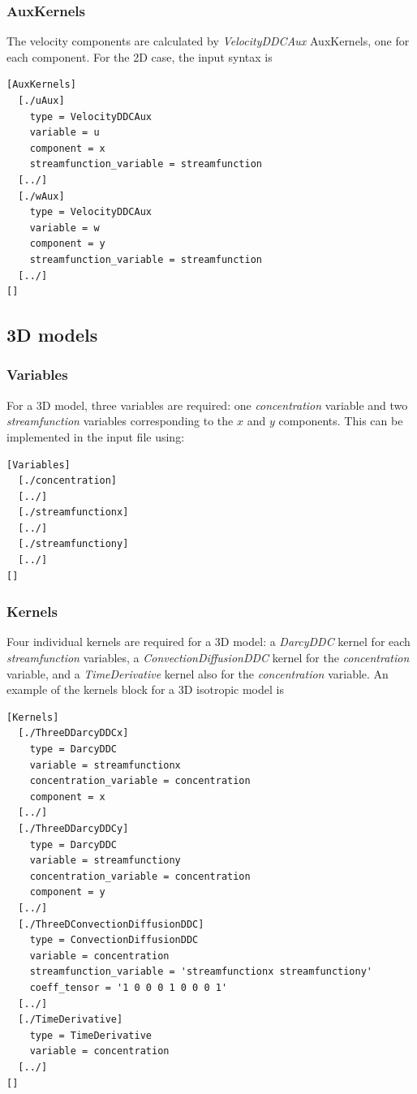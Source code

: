 \documentclass[11pt, a4paper]{csiroreport2012}
\begin{document}
\subsubsection*{AuxKernels}

The velocity components are calculated by \emph{VelocityDDCAux} AuxKernels, one for each component. For the 2D case, the input syntax is
\begin{shaded}
\begin{verbatim}
[AuxKernels]
  [./uAux]
    type = VelocityDDCAux
    variable = u
    component = x
    streamfunction_variable = streamfunction
  [../]
  [./wAux]
    type = VelocityDDCAux
    variable = w
    component = y
    streamfunction_variable = streamfunction
  [../]
[]
\end{verbatim}
\end{shaded}

\subsection{3D models}

\subsubsection*{Variables}

For a 3D model, three variables are required: one \emph{concentration} variable and two \emph{streamfunction} variables corresponding to the $x$ and $y$ components. This can be implemented in the input file using:
\begin{shaded}
\begin{verbatim}
[Variables]  
  [./concentration]  
  [../]  
  [./streamfunctionx]  
  [../]  
  [./streamfunctiony]  
  [../]  
[]
\end{verbatim}
\end{shaded}

\subsubsection*{Kernels}

Four individual kernels are required for a 3D model: a \emph{DarcyDDC} kernel for each \emph{streamfunction} variables, a \emph{ConvectionDiffusionDDC} kernel for the \emph{concentration} variable, and a \emph{TimeDerivative} kernel also for the \emph{concentration} variable. An example of the kernels block for a 3D isotropic model is
\begin{shaded}
\begin{verbatim}
[Kernels]
  [./ThreeDDarcyDDCx]
    type = DarcyDDC
    variable = streamfunctionx
    concentration_variable = concentration
    component = x
  [../]
  [./ThreeDDarcyDDCy]
    type = DarcyDDC
    variable = streamfunctiony
    concentration_variable = concentration
    component = y
  [../]
  [./ThreeDConvectionDiffusionDDC]
    type = ConvectionDiffusionDDC
    variable = concentration
    streamfunction_variable = 'streamfunctionx streamfunctiony'
    coeff_tensor = '1 0 0 0 1 0 0 0 1'
  [../]
  [./TimeDerivative]
    type = TimeDerivative
    variable = concentration
  [../]
[]
\end{verbatim}
\end{shaded}
\end{document}
